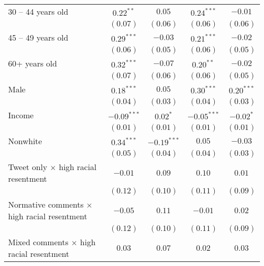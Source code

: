 \begin{table}[h!]
\begin{center}
\begin{scriptsize}
\begin{tabular}{l c c c c}
30 -- 44 years old                                  & $0.22^{**}$   & $0.05$        & $0.24^{***}$  & $-0.01$      \\
                                                    & $(0.07)$      & $(0.06)$      & $(0.06)$      & $(0.06)$     \\
45 -- 49 years old                                  & $0.29^{***}$  & $-0.03$       & $0.21^{***}$  & $-0.02$      \\
                                                    & $(0.06)$      & $(0.05)$      & $(0.06)$      & $(0.05)$     \\
60+ years old                                       & $0.32^{***}$  & $-0.07$       & $0.20^{**}$   & $-0.02$      \\
                                                    & $(0.07)$      & $(0.06)$      & $(0.06)$      & $(0.05)$     \\
Male                                                & $0.18^{***}$  & $0.05$        & $0.30^{***}$  & $0.20^{***}$ \\
                                                    & $(0.04)$      & $(0.03)$      & $(0.04)$      & $(0.03)$     \\
Income                                              & $-0.09^{***}$ & $0.02^{*}$    & $-0.05^{***}$ & $-0.02^{*}$  \\
                                                    & $(0.01)$      & $(0.01)$      & $(0.01)$      & $(0.01)$     \\
Nonwhite                                            & $0.34^{***}$  & $-0.19^{***}$ & $0.05$        & $-0.03$      \\
                                                    & $(0.05)$      & $(0.04)$      & $(0.04)$      & $(0.03)$     \\
Tweet only × high racial resentment                 & $-0.01$       & $0.09$        & $0.10$        & $0.01$       \\
                                                    & $(0.12)$      & $(0.10)$      & $(0.11)$      & $(0.09)$     \\
Normative comments × high racial resentment         & $-0.05$       & $0.11$        & $-0.01$       & $0.02$       \\
                                                    & $(0.12)$      & $(0.10)$      & $(0.11)$      & $(0.09)$     \\
Mixed comments × high racial resentment             & $0.03$        & $0.07$        & $0.02$        & $0.03$       \\

\end{tabular}
\end{scriptsize}
\end{center}
\end{table}
